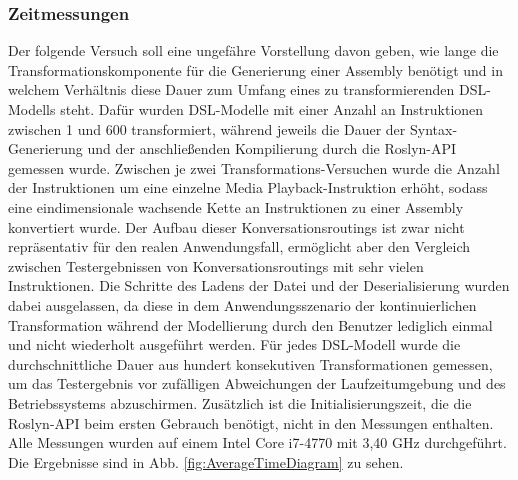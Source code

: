 \subsubsection{Zeitmessungen}
Der folgende Versuch soll eine ungefähre Vorstellung davon geben, wie lange die Transformationskomponente für die Generierung einer Assembly benötigt und in welchem Verhältnis diese Dauer zum Umfang eines zu transformierenden DSL-Modells steht. Dafür wurden DSL-Modelle mit einer Anzahl an Instruktionen zwischen 1 und 600 transformiert, während jeweils die Dauer der Syntax-Generierung und der anschließenden Kompilierung durch die Roslyn-API gemessen wurde. Zwischen je zwei Transformations-Versuchen wurde die Anzahl der Instruktionen um eine einzelne Media Playback-Instruktion erhöht, sodass eine eindimensionale wachsende Kette an Instruktionen zu einer Assembly konvertiert wurde. Der Aufbau dieser Konversationsroutings ist zwar nicht repräsentativ für den realen Anwendungsfall, ermöglicht aber den Vergleich zwischen Testergebnissen von Konversationsroutings mit sehr vielen Instruktionen. Die Schritte des Ladens der Datei und der Deserialisierung wurden dabei ausgelassen, da diese in dem Anwendungsszenario der kontinuierlichen Transformation während der Modellierung durch den Benutzer lediglich einmal und nicht wiederholt ausgeführt werden. Für jedes DSL-Modell wurde die durchschnittliche Dauer aus hundert konsekutiven Transformationen gemessen, um das Testergebnis vor zufälligen Abweichungen der Laufzeitumgebung und des Betriebssystems abzuschirmen. Zusätzlich ist die Initialisierungszeit, die die Roslyn-API beim ersten Gebrauch benötigt, nicht in den Messungen enthalten. Alle Messungen wurden auf einem Intel Core i7-4770 mit 3,40 GHz durchgeführt. Die Ergebnisse sind in Abb. \ref{fig:AverageTimeDiagram} zu sehen. 


